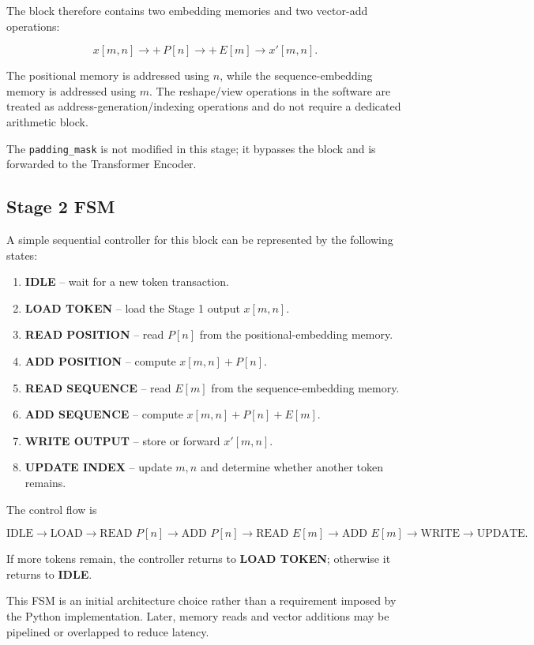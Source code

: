 \documentclass[11pt,a4paper]{article}
\begin{document}
The block therefore contains two embedding memories and two vector-add
operations:

\[
x[m,n]
\rightarrow
\boxed{+\,P[n]}
\rightarrow
\boxed{+\,E[m]}
\rightarrow
x'[m,n].
\]

The positional memory is addressed using $n$, while the sequence-embedding
memory is addressed using $m$. The reshape/view operations in the software are
treated as address-generation/indexing operations and do not require a
dedicated arithmetic block.

The \texttt{padding\_mask} is not modified in this stage; it bypasses the block
and is forwarded to the Transformer Encoder.

\subsection{Stage 2 FSM}

A simple sequential controller for this block can be represented by the
following states:

\begin{enumerate}
    \item \textbf{IDLE} -- wait for a new token transaction.
    \item \textbf{LOAD TOKEN} -- load the Stage 1 output $x[m,n]$.
    \item \textbf{READ POSITION} -- read $P[n]$ from the positional-embedding memory.
    \item \textbf{ADD POSITION} -- compute $x[m,n]+P[n]$.
    \item \textbf{READ SEQUENCE} -- read $E[m]$ from the sequence-embedding memory.
    \item \textbf{ADD SEQUENCE} -- compute $x[m,n]+P[n]+E[m]$.
    \item \textbf{WRITE OUTPUT} -- store or forward $x'[m,n]$.
    \item \textbf{UPDATE INDEX} -- update $m,n$ and determine whether another token remains.
\end{enumerate}

The control flow is

\[
\text{IDLE}
\rightarrow
\text{LOAD}
\rightarrow
\text{READ }P[n]
\rightarrow
\text{ADD }P[n]
\rightarrow
\text{READ }E[m]
\rightarrow
\text{ADD }E[m]
\rightarrow
\text{WRITE}
\rightarrow
\text{UPDATE}.
\]

If more tokens remain, the controller returns to \textbf{LOAD TOKEN}; otherwise
it returns to \textbf{IDLE}.

This FSM is an initial architecture choice rather than a requirement imposed by
the Python implementation. Later, memory reads and vector additions may be
pipelined or overlapped to reduce latency.
\end{document}
